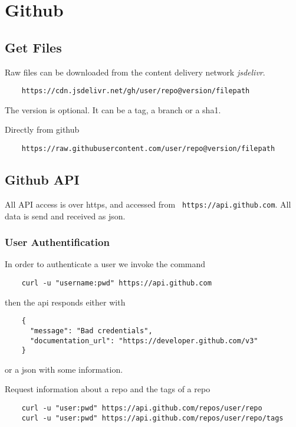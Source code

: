 \chapter{Github}





\section{Get Files}

Raw files can be downloaded from the content delivery network \emph{jsdelivr}.
\begin{verbatim}
    https://cdn.jsdelivr.net/gh/user/repo@version/filepath
\end{verbatim}
The version is optional. It can be a tag, a branch or a sha1.

Directly from github
\begin{verbatim}
    https://raw.githubusercontent.com/user/repo@version/filepath
\end{verbatim}






\section{Github API}

All API access is over https, and accessed from {\tt
  https://api.github.com}. All data is send and received as json.

\subsection{User Authentification}

In order to authenticate a user we invoke the command
{\small
\begin{verbatim}
    curl -u "username:pwd" https://api.github.com
\end{verbatim}%
}%
then the api responds either with
{\small
\begin{verbatim}
    {
      "message": "Bad credentials",
      "documentation_url": "https://developer.github.com/v3"
    }
\end{verbatim}
}
or a json with some information.

Request information about a repo and the tags of a repo
{\small
\begin{verbatim}
    curl -u "user:pwd" https://api.github.com/repos/user/repo
    curl -u "user:pwd" https://api.github.com/repos/user/repo/tags
\end{verbatim}
}

